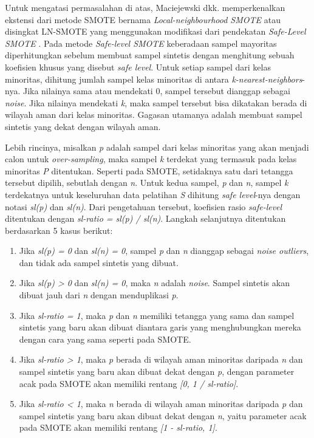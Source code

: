Untuk mengatasi permasalahan di atas, Maciejewski dkk. memperkenalkan ekstensi dari metode SMOTE bernama \textit{Local-neighbourhood SMOTE} atau disingkat LN-SMOTE \cite{maciejewski2011local} yang menggunakan modifikasi dari pendekatan \textit{Safe-Level SMOTE} \cite{bunkhumpornpat2009safe}.
Pada metode \textit{Safe-level SMOTE} keberadaan sampel mayoritas diperhitungkan sebelum membuat sampel sintetis dengan menghitung sebuah koefisien khusus yang disebut \textit{safe level}.
Untuk setiap sampel dari kelas minoritas, dihitung jumlah sampel kelas minoritas di antara \textit{k-nearest-neighbors}-nya.
Jika nilainya sama atau mendekati 0, sampel tersebut dianggap sebagai \textit{noise}.
Jika nilainya mendekati \textit{k}, maka sampel tersebut bisa dikatakan berada di wilayah aman dari kelas minoritas.
Gagasan utamanya adalah membuat sampel sintetis yang dekat dengan wilayah aman.

Lebih rincinya, misalkan \textit{p} adalah sampel dari kelas minoritas yang akan menjadi calon untuk \textit{over-sampling}, maka sampel \textit{k} terdekat yang termasuk pada kelas minoritas \textit{P} ditentukan.
Seperti pada SMOTE, setidaknya satu dari tetangga tersebut dipilih, sebutlah dengan \textit{n}.
Untuk kedua sampel, \textit{p} dan \textit{n}, sampel \textit{k} terdekatnya untuk keseluruhan data pelatihan \textit{S} dihitung \textit{safe level}-nya dengan notasi \textit{sl(p)} dan \textit{sl(n)}.
Dari pengetahuan tersebut, koefisien rasio \textit{safe-level} ditentukan dengan \textit{sl-ratio = sl(p) / sl(n)}.
Langkah selanjutnya ditentukan berdasarkan 5 kasus berikut:
\begin{enumerate}
	\item \label{case:safe-1} Jika \textit{sl(p) = 0} dan \textit{sl(n) = 0}, sampel \textit{p} dan \textit{n} dianggap sebagai \textit{noise outliers}, dan tidak ada sampel sintetis yang dibuat.
	\item Jika \textit{sl(p) > 0} dan \textit{sl(n) = 0}, maka \textit{n} adalah \textit{noise}.
Sampel sintetis akan dibuat jauh dari \textit{n} dengan menduplikasi \textit{p}.
	\item Jika \textit{sl-ratio = 1}, maka \textit{p} dan \textit{n} memiliki tetangga yang sama dan sampel sintetis yang baru akan dibuat diantara garis yang menghubungkan mereka dengan cara yang sama seperti pada SMOTE.
	\item Jika \textit{sl-ratio > 1}, maka \textit{p} berada di wilayah aman minoritas daripada \textit{n} dan sampel sintetis yang baru akan dibuat dekat dengan \textit{p}, dengan parameter acak pada SMOTE akan memiliki rentang \textit{[0, 1 / sl-ratio]}.
	\item Jika \textit{sl-ratio < 1}, maka \textit{n} berada di wilayah aman minoritas daripada \textit{p} dan sampel sintetis yang baru akan dibuat dekat dengan \textit{n}, yaitu parameter acak pada SMOTE akan memiliki rentang \textit{[1 - sl-ratio, 1]}.
\end{enumerate}

